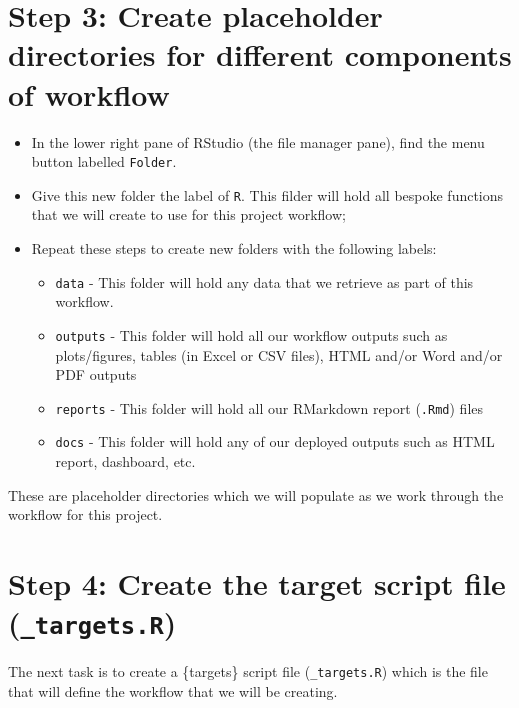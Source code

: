 \documentclass[
  12pt,
]{book}
\begin{document}
\hypertarget{step-3-create-placeholder-directories-for-different-components-of-workflow}{%
\section{Step 3: Create placeholder directories for different components of workflow}\label{step-3-create-placeholder-directories-for-different-components-of-workflow}}

\begin{itemize}
\item
  In the lower right pane of RStudio (the file manager pane), find the menu button labelled \texttt{Folder}.
\item
  Give this new folder the label of \texttt{R}. This filder will hold all bespoke functions that we will create to use for this project workflow;
\item
  Repeat these steps to create new folders with the following labels:

  \begin{itemize}
  \item
    \texttt{data} - This folder will hold any data that we retrieve as part of this workflow.
  \item
    \texttt{outputs} - This folder will hold all our workflow outputs such as plots/figures, tables (in Excel or CSV files), HTML and/or Word and/or PDF outputs
  \item
    \texttt{reports} - This folder will hold all our RMarkdown report (\texttt{.Rmd}) files
  \item
    \texttt{docs} - This folder will hold any of our deployed outputs such as HTML report, dashboard, etc.
  \end{itemize}
\end{itemize}

These are placeholder directories which we will populate as we work through the workflow for this project.

\hypertarget{step-4-create-the-target-script-file-_targets.r}{%
\section{\texorpdfstring{Step 4: Create the target script file (\texttt{\_targets.R})}{Step 4: Create the target script file (\_targets.R)}}\label{step-4-create-the-target-script-file-_targets.r}}

The next task is to create a \{targets\} script file (\texttt{\_targets.R}) which is the file that will define the workflow that we will be creating.
\end{document}
